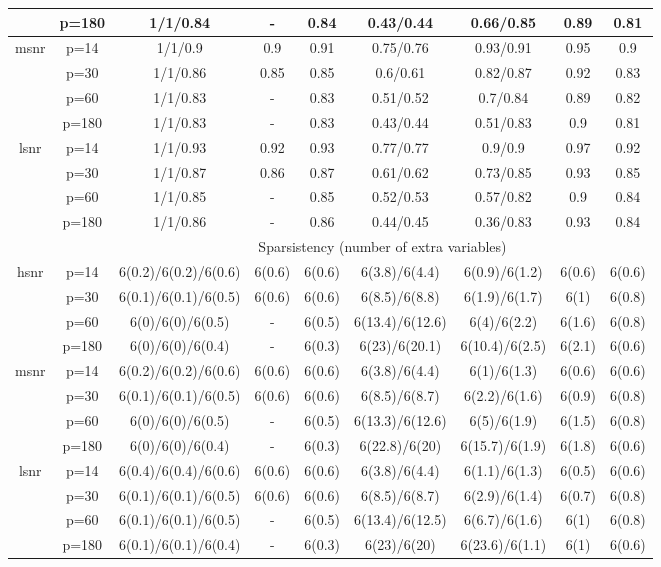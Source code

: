\begin{table}[ht]
{\begin{tabular}{|c|c|ccccccc|}
   & p=180 & 1/1/0.84 & - & 0.84 & 0.43/0.44 & 0.66/0.85 & 0.89 & 0.81 \\ 
  \midrule\multirow{4}[2]{*}{msnr} & p=14 & 1/1/0.9 & 0.9 & 0.91 & 0.75/0.76 & 0.93/0.91 & 0.95 & 0.9 \\ 
   & p=30 & 1/1/0.86 & 0.85 & 0.85 & 0.6/0.61 & 0.82/0.87 & 0.92 & 0.83 \\ 
   & p=60 & 1/1/0.83 & - & 0.83 & 0.51/0.52 & 0.7/0.84 & 0.89 & 0.82 \\ 
   & p=180 & 1/1/0.83 & - & 0.83 & 0.43/0.44 & 0.51/0.83 & 0.9 & 0.81 \\ 
  \midrule\multirow{4}[2]{*}{lsnr} & p=14 & 1/1/0.93 & 0.92 & 0.93 & 0.77/0.77 & 0.9/0.9 & 0.97 & 0.92 \\ 
   & p=30 & 1/1/0.87 & 0.86 & 0.87 & 0.61/0.62 & 0.73/0.85 & 0.93 & 0.85 \\ 
   & p=60 & 1/1/0.85 & - & 0.85 & 0.52/0.53 & 0.57/0.82 & 0.9 & 0.84 \\ 
   & p=180 & 1/1/0.86 & - & 0.86 & 0.44/0.45 & 0.36/0.83 & 0.93 & 0.84 \\ 
   \midrule 
 \multicolumn{1}{|c}{} &       & \multicolumn{7}{c|}{Sparsistency (number of extra variables)} \\
\midrule\multirow{4}[2]{*}{hsnr} & p=14 & 6(0.2)/6(0.2)/6(0.6) & 6(0.6) & 6(0.6) & 6(3.8)/6(4.4) & 6(0.9)/6(1.2) & 6(0.6) & 6(0.6) \\ 
   & p=30 & 6(0.1)/6(0.1)/6(0.5) & 6(0.6) & 6(0.6) & 6(8.5)/6(8.8) & 6(1.9)/6(1.7) & 6(1) & 6(0.8) \\ 
   & p=60 & 6(0)/6(0)/6(0.5) & - & 6(0.5) & 6(13.4)/6(12.6) & 6(4)/6(2.2) & 6(1.6) & 6(0.8) \\ 
   & p=180 & 6(0)/6(0)/6(0.4) & - & 6(0.3) & 6(23)/6(20.1) & 6(10.4)/6(2.5) & 6(2.1) & 6(0.6) \\ 
  \midrule\multirow{4}[2]{*}{msnr} & p=14 & 6(0.2)/6(0.2)/6(0.6) & 6(0.6) & 6(0.6) & 6(3.8)/6(4.4) & 6(1)/6(1.3) & 6(0.6) & 6(0.6) \\ 
   & p=30 & 6(0.1)/6(0.1)/6(0.5) & 6(0.6) & 6(0.6) & 6(8.5)/6(8.7) & 6(2.2)/6(1.6) & 6(0.9) & 6(0.8) \\ 
   & p=60 & 6(0)/6(0)/6(0.5) & - & 6(0.5) & 6(13.3)/6(12.6) & 6(5)/6(1.9) & 6(1.5) & 6(0.8) \\ 
   & p=180 & 6(0)/6(0)/6(0.4) & - & 6(0.3) & 6(22.8)/6(20) & 6(15.7)/6(1.9) & 6(1.8) & 6(0.6) \\ 
  \midrule\multirow{4}[2]{*}{lsnr} & p=14 & 6(0.4)/6(0.4)/6(0.6) & 6(0.6) & 6(0.6) & 6(3.8)/6(4.4) & 6(1.1)/6(1.3) & 6(0.5) & 6(0.6) \\ 
   & p=30 & 6(0.1)/6(0.1)/6(0.5) & 6(0.6) & 6(0.6) & 6(8.5)/6(8.7) & 6(2.9)/6(1.4) & 6(0.7) & 6(0.8) \\ 
   & p=60 & 6(0.1)/6(0.1)/6(0.5) & - & 6(0.5) & 6(13.4)/6(12.5) & 6(6.7)/6(1.6) & 6(1) & 6(0.8) \\ 
   & p=180 & 6(0.1)/6(0.1)/6(0.4) & - & 6(0.3) & 6(23)/6(20) & 6(23.6)/6(1.1) & 6(1) & 6(0.6) \\ 
   \bottomrule 
\end{tabular}
}
\end{table}
